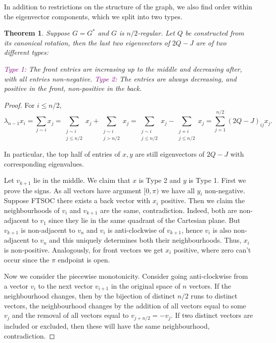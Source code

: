 \documentclass[11pt]{article}
\newcommand{\purp}[1]{\textcolor{purple}{#1}}
\newtheorem{thm}{Theorem}[section]
\begin{document}
In addition to restrictions on the structure of the graph, we also find order within the eigenvector components, which we split into two types. 

\begin{thm}\label{thm:2Q-J}
    Suppose $G = G^*$ and $G$ is $n/2$-regular. Let $Q$ be constructed from its canonical rotation, then the last two eigenvectors of $2Q-J$ are of two different types:
    \begin{outline}[enumerate]
        \1 \purp{Type 1}: The front entries are increasing up to the middle and decreasing after, with all entries non-negative. 
        \1 \purp{Type 2}: The entries are always decreasing, and positive in the front, non-positive in the back. 
    \end{outline}
\end{thm}
\begin{proof}
    For $i \le n/2$, 
    \[\lambda_{n-1} x_i = \sum_{j \sim i} x_j = \sum_{\substack{j \sim i \\ j \le n/2}} x_j + \sum_{\substack{j \sim i \\ j > n/2}} x_j = \sum_{\substack{j \sim i \\ j \le n/2}} x_j - \sum_{\substack{j \not \sim i \\ j \le n/2}} x_j = \sum_{j = 1}^{n/2} (2Q-J)_{ij} x_j.\]
    
    In particular, the top half of entries of $x,y$ are still eigenvectors of $2Q-J$ with corresponding eigenvalues. 

    Let $v_{k+1}$ lie in the middle. We claim that $x$ is Type 2 and $y$ is Type 1. First we prove the signs. As all vectors have argument $[0, \pi)$ we have all $y_i$ non-negative. Suppose FTSOC there exists a back vector with $x_i$ positive. Then we claim the neighbourhoods of $v_i$ and $v_{k+1}$ are the same, contradiction. Indeed, both are non-adjacent to $v_1$ since they lie in the same quadrant of the Cartesian plane. But $v_{k+1}$ is non-adjacent to $v_n$ and $v_i$ is anti-clockwise of $v_{k+1}$, hence $v_i$ is also non-adjacent to $v_n$ and this uniquely determines both their neighbourhoods. Thus, $x_i$ is non-positive. Analogously, for front vectors we get $x_i$ positive, where zero can't occur since the $\pi$ endpoint is open.

    Now we consider the piecewise monotonicity. Consider going anti-clockwise from a vector $v_i$ to the next vector $v_{i+1}$ in the original space of $n$ vectors. If the neighbourhood changes, then by the bijection of distinct $n/2$ runs to distinct vectors, the neighbourhood changes by the addition of all vectors equal to some $v_j$ and the removal of all vectors equal to $v_{j+n/2} = -v_j$. If two distinct vectors are included or excluded, then these will have the same neighbourhood, contradiction. 


\end{proof}
\end{document}
